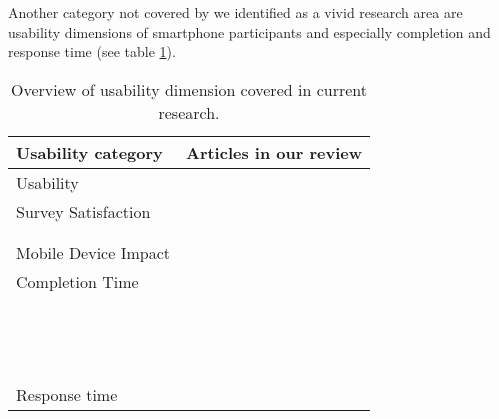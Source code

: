 Another category not covered by \cite{biemer_total_2010} we identified as a vivid research area are usability dimensions of smartphone participants and especially completion and response time (see table \ref{tab: usability}).

\begin{table}
    \centering
	\begin{tabular}{ll}
		\toprule
		Usability category & Articles in our review\\
		\midrule
		Usability & \cite{mavletova_grid_2018, huff_comparison_2015}\\
        Survey Satisfaction & \cite{de_bruijne_comparing_2013, mavletova_grid_2018}\\
    	& \cite{mavletova_sensitive_2013, lugtig_use_2016}\\
    	& \cite{toepoel_what_2014}\\
        Mobile Device Impact & \cite{schlosser_mobile_2018, mavletova_mobile_2014}\\
        Completion Time & \cite{revilla_are_2017, ha_are_2019}\\
    	& \cite{revilla_are_2017, de_bruijne_comparing_2013}\\
    	& \cite{weigold_computerized_2021, ha_data_2020}\\
    	& \cite{mavletova_data_2013, hartman_does_2019}\\
    	& \cite{liebe_does_2015, antoun_effects_2017}\\
    	& \cite{lee_experimental_2019, gummer_explaining_2015}\\
    	& \cite{antoun_factors_2020, mavletova_grid_2018}\\
    	& \cite{lambert_living_2015, buskirk_making_2014}\\
    	& \cite{schlosser_mobile_2018, zou_mobile_2021}\\
    	& \cite{daikeler_motivated_2020, revilla_open_2016}\\
    	& \cite{skeie_smartphone_2019, revilla_testing_2018}\\
    	& \cite{huff_comparison_2015, mason_effect_2019}\\
    	& \cite{struminskaya_effects_2015, lugtig_use_2016}\\
    	& \cite{tourangeau_web_2018, keusch_web_2017}\\
    	& \cite{toepoel_what_2014, couper_why_2017}\\
    	Response time & \cite{liebe_does_2015, schlosser_mobile_2018}\\
        \bottomrule
    \end{tabular}
	\caption{Overview of usability dimension covered in current research.}
	\label{tab: usability}
\end{table}

